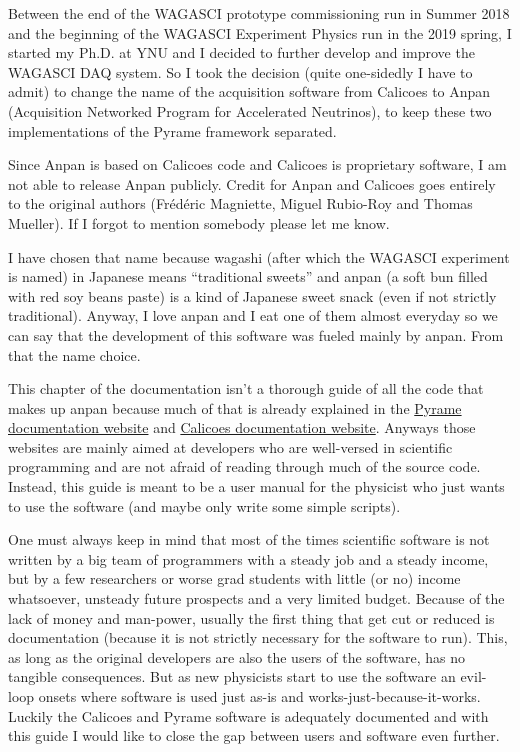 Between the end of the WAGASCI prototype commissioning run in Summer 2018 and
the beginning of the WAGASCI Experiment Physics run in the 2019 spring, I
started my Ph.D. at YNU and I decided to further develop and improve the WAGASCI
DAQ system. So I took the decision (quite one-sidedly I have to admit) to change
the name of the acquisition software from Calicoes to Anpan (Acquisition
Networked Program for Accelerated Neutrinos), to keep these two implementations
of the Pyrame framework separated.

Since Anpan is based on Calicoes code and Calicoes is proprietary software, I am
not able to release Anpan publicly. Credit for Anpan and Calicoes goes entirely
to the original authors (Frédéric Magniette, Miguel Rubio-Roy and Thomas
Mueller). If I forgot to mention somebody please let me know.

I have chosen that name because wagashi (after which the WAGASCI experiment is
named) in Japanese means ``traditional sweets'' and anpan (a soft bun filled
with red soy beans paste) is a kind of Japanese sweet snack (even if not
strictly traditional). Anyway, I love anpan and I eat one of them almost
everyday so we can say that the development of this software was fueled mainly
by anpan. From that the name choice.

This chapter of the documentation isn't a thorough guide of all the code that
makes up anpan because much of that is already explained in the
\href{http://llr.in2p3.fr/sites/pyrame/documentation/}{Pyrame documentation
  website} and
\href{http://llr.in2p3.fr/sites/pyrame/calicoes/documentation/}{Calicoes
  documentation website}. Anyways those websites are mainly aimed at developers
who are well-versed in scientific programming and are not afraid of reading
through much of the source code. Instead, this guide is meant to be a user
manual for the physicist who just wants to use the software (and maybe only
write some simple scripts).

One must always keep in mind that most of the times scientific software is not
written by a big team of programmers with a steady job and a steady income, but
by a few researchers or worse grad students with little (or no) income
whatsoever, unsteady future prospects and a very limited budget. Because of the
lack of money and man-power, usually the first thing that get cut or reduced is
documentation (because it is not strictly necessary for the software to
run). This, as long as the original developers are also the users of the
software, has no tangible consequences. But as new physicists start to use the
software an evil-loop onsets where software is used just as-is and
works-just-because-it-works. Luckily the Calicoes and Pyrame software is
adequately documented and with this guide I would like to close the gap between
users and software even further.

